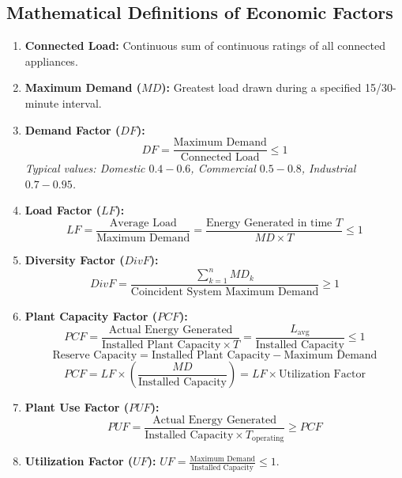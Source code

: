 \documentclass[11pt,a4paper]{article}
\begin{document}
\subsection{Mathematical Definitions of Economic Factors}

\begin{enumerate}
  \item \textbf{Connected Load:} Continuous sum of continuous ratings of all connected appliances.
  \item \textbf{Maximum Demand ($MD$):} Greatest load drawn during a specified 15/30-minute interval.
  \item \textbf{Demand Factor ($DF$):}
    \begin{equation}
      DF = \frac{\text{Maximum Demand}}{\text{Connected Load}} \le 1
    \end{equation}
    \emph{Typical values: Domestic $0.4-0.6$, Commercial $0.5-0.8$, Industrial $0.7-0.95$.}
  \item \textbf{Load Factor ($LF$):}
    \begin{equation}
      LF = \frac{\text{Average Load}}{\text{Maximum Demand}} = \frac{\text{Energy Generated in time } T}{MD \times T} \le 1
    \end{equation}
  \item \textbf{Diversity Factor ($DivF$):}
    \begin{equation}
      DivF = \frac{\sum_{k=1}^{n} MD_k}{\text{Coincident System Maximum Demand}} \ge 1
    \end{equation}
  \item \textbf{Plant Capacity Factor ($PCF$):}
    \begin{equation}
      PCF = \frac{\text{Actual Energy Generated}}{\text{Installed Plant Capacity} \times T} = \frac{L_{\text{avg}}}{\text{Installed Capacity}} \le 1
    \end{equation}
    \begin{equation}
      \text{Reserve Capacity} = \text{Installed Plant Capacity} - \text{Maximum Demand}
    \end{equation}
    \begin{equation}
      PCF = LF \times \left(\frac{MD}{\text{Installed Capacity}}\right) = LF \times \text{Utilization Factor}
    \end{equation}
  \item \textbf{Plant Use Factor ($PUF$):}
    \begin{equation}
      PUF = \frac{\text{Actual Energy Generated}}{\text{Installed Capacity} \times T_{\text{operating}}} \ge PCF
    \end{equation}
  \item \textbf{Utilization Factor ($UF$):} $UF = \frac{\text{Maximum Demand}}{\text{Installed Capacity}} \le 1$.
\end{enumerate}
\end{document}
